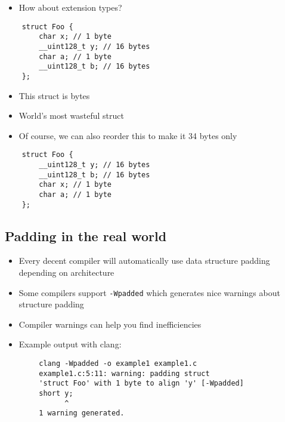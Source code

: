 \documentclass{beamer}
\begin{document}
\begin{frame}[fragile]{\insertsection}{\insertsubsection}
    \begin{itemize}
        \item How about extension types?
    \end{itemize}
    \begin{verbatim}
    struct Foo {
        char x; // 1 byte
        __uint128_t y; // 16 bytes
        char a; // 1 byte
        __uint128_t b; // 16 bytes
    };
    \end{verbatim}
    \begin{itemize}
        \item This struct is  bytes
        \item World's most wasteful struct
    \end{itemize}
\end{frame}

\begin{frame}[fragile]{\insertsection}{\insertsubsection}
    \begin{itemize}
        \item Of course, we can also reorder this to make it 34 bytes only
    \end{itemize}
    \begin{verbatim}
    struct Foo {
        __uint128_t y; // 16 bytes
        __uint128_t b; // 16 bytes
        char x; // 1 byte
        char a; // 1 byte
    };
    \end{verbatim}
\end{frame}

\subsection{Padding in the real world}
\begin{frame}[fragile]{\insertsection}{\insertsubsection}
    \begin{itemize}
        \item Every decent compiler will automatically use data structure padding depending
            on architecture\pause
        \item Some compilers support \verb|-Wpadded| which generates nice warnings about structure
            padding\pause
        \item Compiler warnings can help you find inefficiencies
        \item Example output with clang:
    \end{itemize}
    \begin{verbatim}
        clang -Wpadded -o example1 example1.c
        example1.c:5:11: warning: padding struct 
        'struct Foo' with 1 byte to align 'y' [-Wpadded]
        short y;
              ^
        1 warning generated.
    \end{verbatim}
\end{frame}
\end{document}
